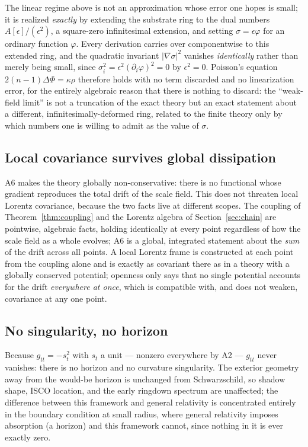 \documentclass[aps,prd,twocolumn,superscriptaddress,nofootinbib]{revtex4-2}
\begin{document}
The linear regime above is not an approximation whose error one hopes is
small; it is realized \emph{exactly} by extending the substrate ring to
the dual numbers $A[\epsilon]/(\epsilon^2)$, a square-zero infinitesimal
extension, and setting $\sigma = \epsilon\varphi$ for an ordinary
function $\varphi$. Every derivation carries over componentwise to this
extended ring, and the quadratic invariant $|\nabla\sigma|^2$ vanishes
\emph{identically} rather than merely being small, since
$\sigma_i^2 = \epsilon^2(\partial_i\varphi)^2 = 0$ by $\epsilon^2=0$.
Poisson's equation $2(n-1)\Delta\Phi = \kappa\rho$ therefore holds with
no term discarded and no linearization error, for the entirely
algebraic reason that there is nothing to discard: the ``weak-field
limit'' is not a truncation of the exact theory but an exact statement
about a different, infinitesimally-deformed ring, related to the finite
theory only by which numbers one is willing to admit as the value of
$\sigma$.

\subsection{Local covariance survives global dissipation}

A6 makes the theory globally non-conservative: there is no functional
whose gradient reproduces the total drift of the scale field. This does
not threaten local Lorentz covariance, because the two facts live at
different scopes. The coupling of Theorem~\ref{thm:coupling} and the
Lorentz algebra of Section~\ref{sec:chain} are pointwise, algebraic
facts, holding identically at every point regardless of how the scale
field as a whole evolves; A6 is a global, integrated statement about the
\emph{sum} of the drift across all points. A local Lorentz frame is
constructed at each point from the coupling alone and is exactly as
covariant there as in a theory with a globally conserved potential;
openness only says that no single potential accounts for the drift
\emph{everywhere at once}, which is compatible with, and does not
weaken, covariance at any one point.

\subsection{No singularity, no horizon}

Because $g_{tt}=-s_t^2$ with $s_t$ a unit — nonzero everywhere by A2 —
$g_{tt}$ never vanishes: there is no horizon and no curvature
singularity. The exterior geometry away from the would-be horizon is
unchanged from Schwarzschild, so shadow shape, ISCO location, and the
early ringdown spectrum are unaffected; the difference between this
framework and general relativity is concentrated entirely in the
boundary condition at small radius, where general relativity imposes
absorption (a horizon) and this framework cannot, since nothing in it is
ever exactly zero.
\end{document}

